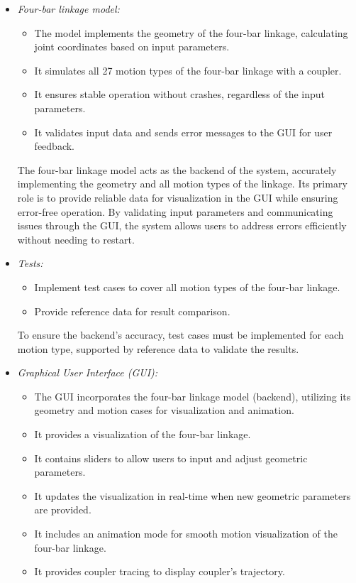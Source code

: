 \documentclass{article}
\begin{document}
\begin{itemize}
	\item \textit{Four-bar linkage model:}
	\begin{itemize}
		\item The model implements the geometry of the four-bar linkage, calculating joint coordinates based on input parameters.
		\item It simulates all 27 motion types of the four-bar linkage with a coupler.
		\item It ensures stable operation without crashes, regardless of the input parameters.
		\item It validates input data and sends error messages to the GUI for user feedback.
	\end{itemize}
	
	The four-bar linkage model acts as the backend of the system, accurately implementing the geometry and all motion types of the linkage. Its primary role is to provide reliable data for visualization in the GUI while ensuring error-free operation. By validating input parameters and communicating issues through the GUI, the system allows users to address errors efficiently without needing to restart.
	
	\item \textit{Tests:}
	\begin{itemize}
		\item Implement test cases to cover all motion types of the four-bar linkage.
		\item Provide reference data for result comparison.
	\end{itemize}
	
	To ensure the backend's accuracy, test cases must be implemented for each motion type, supported by reference data to validate the results.
	
	\item \textit{Graphical User Interface (GUI):}
	\begin{itemize}
		\item The GUI incorporates the four-bar linkage model (backend), utilizing its geometry and motion cases for visualization and animation.
		\item It provides a visualization of the four-bar linkage.
		\item It contains sliders to allow users to input and adjust geometric parameters.
		\item It updates the visualization in real-time when new geometric parameters are provided.
		\item It includes an animation mode for smooth motion visualization of the four-bar linkage.
		\item It provides coupler tracing to display coupler's trajectory.
	\end{itemize}
	

\end{itemize}
\end{document}

